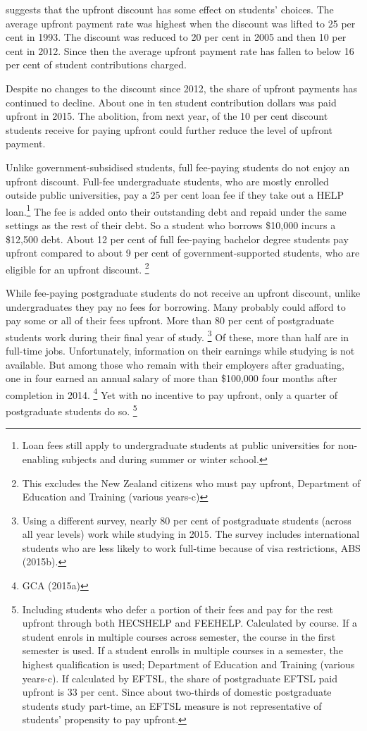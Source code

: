 \documentclass[embargoed]{grattan}
\begin{document}
 suggests that the upfront discount has some effect on students' choices.
The average upfront payment rate was highest when the discount was lifted to 25 per cent in 1993.
The discount was reduced to 20 per cent in 2005 and then 10 per cent in 2012.
Since then the average upfront payment rate has fallen to below 16 per cent of student contributions charged.

Despite no changes to the discount since 2012, the share of upfront payments has continued to decline.
About one in ten student contribution dollars was paid upfront in 2015.
The abolition, from next year, of the 10 per cent discount students receive for paying upfront could further reduce the level of upfront payment.

Unlike government-subsidised students, full fee-paying students do not enjoy an upfront discount.
Full-fee undergraduate students, who are mostly enrolled outside public universities, pay a 25 per cent loan fee if they take out a \gls{HELP} loan.\footnote{Loan fees still apply to undergraduate students at public universities for non-enabling subjects and during summer or winter school.} The fee is added onto their outstanding debt and repaid under the same settings as the rest of their debt.
So a student who borrows \$10,000 incurs a \$12,500 debt.
About 12 per cent of full fee-paying bachelor degree students pay upfront compared to about 9 per cent of government-supported students, who are eligible for an upfront discount.%
\footnote{This excludes the New Zealand citizens who must pay upfront, Department of Education and Training (various years-c)}

While fee-paying postgraduate students do not receive an upfront discount, unlike undergraduates they pay no fees for borrowing.
Many probably could afford to pay some or all of their fees upfront.
More than 80 per cent of postgraduate students work during their final year of study.%
\footnote{Using a different survey, nearly 80 per cent of postgraduate students (across all year levels) work while studying in 2015.
The survey includes international students who are less likely to work full-time because of visa restrictions, ABS (2015b).} Of these, more than half are in full-time jobs.
Unfortunately, information on their earnings while studying is not available.
But among those who remain with their employers after graduating, one in four earned an annual salary of more than \$100,000 four months after completion in 2014.%
\footnote{GCA (2015a)} Yet with no incentive to pay upfront, only a quarter of postgraduate students do so.%
\footnote{Including students who defer a portion of their fees and pay for the rest upfront through both \gls{HECSHELP} and \gls{FEEHELP}.
Calculated by course.
If a student enrols in multiple courses across semester, the course in the first semester is used.
If a student enrolls in multiple courses in a semester, the highest qualification is used; Department of Education and Training (various years-c).
If calculated by \gls{EFTSL}, the share of postgraduate \gls{EFTSL} paid upfront is 33 per cent.
Since about two-thirds of domestic postgraduate students study part-time, an \gls{EFTSL} measure is not representative of students' propensity to pay upfront.}
\end{document}
